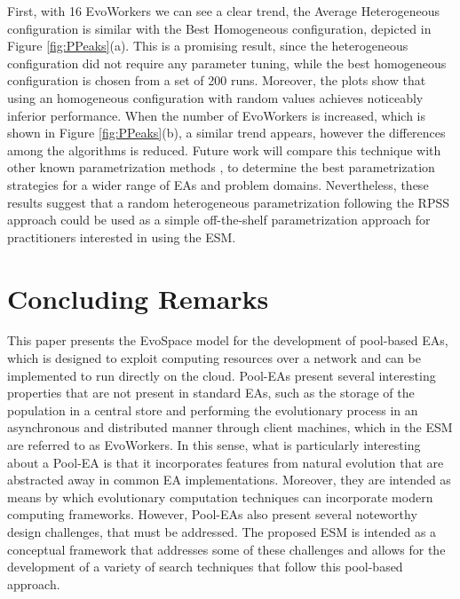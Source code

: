 First, with 16 EvoWorkers we can see a clear trend, the Average Heterogeneous configuration is similar with the Best Homogeneous configuration,
depicted in Figure \ref{fig:PPeaks}(a).
This is a promising result, since the heterogeneous configuration did not require any parameter tuning, while the best homogeneous configuration
is chosen from a set of 200 runs.
Moreover, the plots show that using an homogeneous configuration with random values achieves noticeably inferior performance.
When the number of EvoWorkers is increased, which is shown in Figure \ref{fig:PPeaks}(b), a similar trend appears,
however the differences among the algorithms is reduced.
Future work will compare this technique with other known parametrization methods \cite{cantu}, to determine the best
parametrization strategies for a wider range of EAs and problem domains. 
Nevertheless, these results suggest that a random heterogeneous parametrization following the RPSS approach could be used as a simple off-the-shelf
parametrization approach for practitioners interested in using the ESM.



\section{Concluding Remarks}
\label{sec:conclusions}
This paper presents the EvoSpace model for the development of pool-based EAs, which is designed to exploit computing resources over a network and can be implemented to run directly on the cloud.
Pool-EAs present several interesting properties that are not present
in standard EAs, such as the storage of the population in a central store and
performing the evolutionary process in an asynchronous and distributed manner through client machines,
which in the ESM are referred to as EvoWorkers.
In this sense, what is particularly interesting about a Pool-EA is
that it incorporates features from natural evolution that are
abstracted away in common EA implementations. %
Moreover, they are intended as means by which evolutionary computation techniques can incorporate modern computing frameworks.
However, Pool-EAs also present several noteworthy design challenges, that must be addressed.
The proposed ESM is intended as a conceptual framework that addresses some of these challenges and allows for the development of a variety of search techniques
that follow this pool-based approach.

